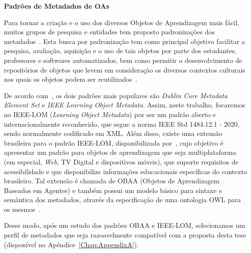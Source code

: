 \textbf{Padrões de Metadados de OAs}

Para tornar a criação e o uso dos diversos Objetos de Aprendizagem mais fácil, muitos grupos de pesquisa e entidades tem proposto padronizações dos metadados~\citep{vicari:2009}. Esta busca por padronização tem como principal objetivo facilitar a pesquisa, avaliação, aquisição e o uso de tais objetos por parte dos estudantes, professores e softwares automatizados, bem como permitir o desenvolvimento de repositórios de objetos que levem em consideração os diversos contextos culturais nos quais os objetos podem ser reutilizados~\citep{learning2002ieee}.

De acordo com~\cite{mcclelland:2003}, os dois padrões mais populares são \textit{Dublin Core Metadata Element Set} e \textit{IEEE Learning Object Metadata}. Assim, neste trabalho, focaremos no IEEE-LOM (\textit{Learning Object Metadata}) por ser um padrão aberto e internacionalmente reconhecido, que segue a norma IEEE Std 1484.12.1 - 2020, sendo normalmente codificado em XML. Além disso, existe uma extensão brasileira para o padrão IEEE-LOM, disponibilizada por~\cite{vicari:2009}, cujo  objetivo é apresentar um padrão para objetos de aprendizagem que seja multiplataforma (em especial, \textit{Web}, TV Digital e dispositivos móveis), que suporte requisitos de acessibilidade e que disponibilize informações educacionais específicas do contexto brasileiro. Tal extensão é chamada de OBAA (Objetos de Aprendizagem Baseados em Agentes) e também possui um modelo básico para sintaxe e semântica dos metadados, através da especificação de uma ontologia OWL para os mesmos~\citep{vicari:2009}.

Desse modo, após um estudo dos padrões OBAA e IEEE-LOM, selecionamos um perfil de metadados que seja razoavelmente compatível com a proposta desta tese (disponível no Apêndice~\ref{Chap:AppendixA}).


